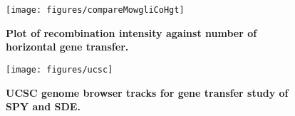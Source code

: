 \documentclass[10pt]{article}
\begin{document}
\begin{figure}[!ht]
\begin{center}
\texttt{[image: figures/compareMowgliCoHgt]}
\end{center}
\caption{
{\bf Plot of recombination intensity against number
of horizontal gene transfer.}}
\label{fig:cmpcomowglihgt}
\end{figure}
\clearpage{}


\begin{figure}[!ht]
\texttt{[image: figures/ucsc]}
\caption{
{\bf UCSC genome browser tracks for gene transfer study of
SPY and SDE.}}
\label{fig:ucsc}
\end{figure}
\clearpage{}%
\end{document}

